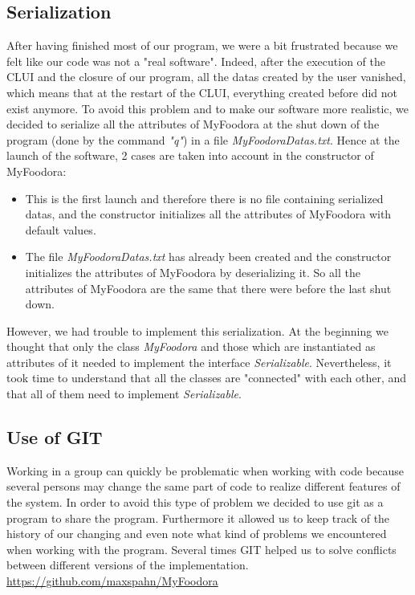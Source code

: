 \subsection{Serialization}
\label{sub:serialization}
After having finished most of our program, we were a bit frustrated because we felt like our code was not a "real software". Indeed, after the execution of the CLUI and the closure of our program, all the datas created by the user vanished, which means that at the restart of the CLUI, everything created before did not exist anymore. To avoid this problem and to make our software more realistic, we decided to serialize all the attributes of MyFoodora at the shut down of the program (done by the command \textit{"q"}) in a file \textit{MyFoodoraDatas.txt}.
Hence at the launch of the software, 2	cases are taken into account in the constructor of MyFoodora:
\begin{itemize}
	\item{} This is the first launch and therefore there is no file containing serialized datas, and the constructor initializes all the attributes of MyFoodora with default values.
	\item{} The file \textit{MyFoodoraDatas.txt} has already been created and the constructor initializes the attributes of MyFoodora by deserializing it. So all the attributes of MyFoodora are the same that there were before the last shut down. 	
\end{itemize}

However, we had trouble to implement this serialization. At the beginning we thought that only the class \textit{MyFoodora} and those which are instantiated as attributes of it needed to implement the interface \textit{Serializable}. Nevertheless, it took time to understand that all the classes are "connected" with each other, and that all of them need to implement \textit{Serializable}.

\subsection{Use of GIT}
\label{sub:use_of_git}

Working in a group can quickly be problematic when working with code because several persons
may change the same part of code to realize different features of the system. In order to 
avoid this type of problem we decided to use git as a program to share the program. 
Furthermore it allowed us to keep track of the history of our changing and even note what
kind of problems we encountered when working with the program. Several times \textsc{GIT}
helped us to solve conflicts between different versions of the implementation.
\url{https://github.com/maxspahn/MyFoodora}
